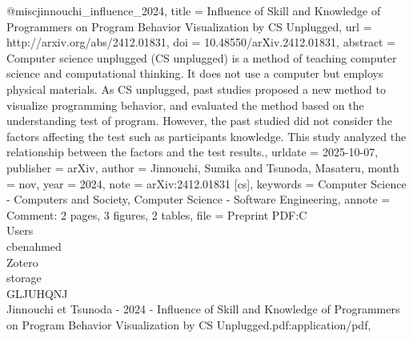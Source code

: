 @misc{jinnouchi_influence_2024,
	title = {Influence of {Skill} and {Knowledge} of {Programmers} on {Program} {Behavior} {Visualization} by {CS} 
{Unplugged}},
	url = {http://arxiv.org/abs/2412.01831},
	doi = {10.48550/arXiv.2412.01831},
	abstract = {Computer science unplugged (CS unplugged) is a method of teaching computer science and computational 
thinking. It does not use a computer but employs physical materials. As CS unplugged, past studies proposed a new method to 
visualize programming behavior, and evaluated the method based on the understanding test of program. However, the past studied 
did not consider the factors affecting the test such as participants knowledge. This study analyzed the relationship between the 
factors and the test results.},
	urldate = {2025-10-07},
	publisher = {arXiv},
	author = {Jinnouchi, Sumika and Tsunoda, Masateru},
	month = nov,
	year = {2024},
	note = {arXiv:2412.01831 [cs]},
	keywords = {Computer Science - Computers and Society, Computer Science - Software Engineering},
	annote = {Comment: 2 pages, 3 figures, 2 tables},
	file = {Preprint PDF:C\:\\Users\\cbenahmed\\Zotero\\storage\\GLJUHQNJ\\Jinnouchi et Tsunoda - 2024 - Influence of Skill 
and Knowledge of Programmers on Program Behavior Visualization by CS Unplugged.pdf:application/pdf},
}

